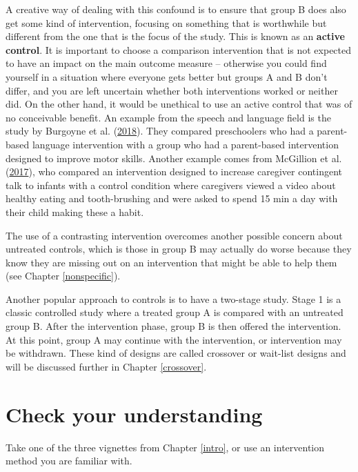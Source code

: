 \documentclass{krantz}
\begin{document}
A creative way of dealing with this confound is to ensure that group B does also get some kind of intervention, focusing on something that is worthwhile but different from the one that is the focus of the study. This is known as an \textbf{active control}. It is important to choose a comparison intervention that is not expected to have an impact on the main outcome measure -- otherwise you could find yourself in a situation where everyone gets better but groups A and B don't differ, and you are left uncertain whether both interventions worked or neither did. On the other hand, it would be unethical to use an active control that was of no conceivable benefit. An example from the speech and language field is the study by Burgoyne et al. (\protect\hyperlink{ref-burgoyne2018}{2018}). They compared preschoolers who had a parent-based language intervention with a group who had a parent-based intervention designed to improve motor skills. Another example comes from McGillion et al. (\protect\hyperlink{ref-mcgillion2017}{2017}), who compared an intervention designed to increase caregiver contingent talk to infants with a control condition where caregivers viewed a video about healthy eating and tooth-brushing and were asked to spend 15 min a day with their child making these a habit.

The use of a contrasting intervention overcomes another possible concern about untreated controls, which is those in group B may actually do worse because they know they are missing out on an intervention that might be able to help them (see Chapter \ref{nonspecific}).

Another popular approach to controls is to have a two-stage study. Stage 1 is a classic controlled study where a treated group A is compared with an untreated group B. After the intervention phase, group B is then offered the intervention. At this point, group A may continue with the intervention, or intervention may be withdrawn. These kind of designs are called crossover or wait-list designs and will be discussed further in Chapter \ref{crossover}.

\hypertarget{check-your-understanding-5}{%
\section{Check your understanding}\label{check-your-understanding-5}}

Take one of the three vignettes from Chapter \ref{intro}, or use an intervention method you are familiar with.
\end{document}
